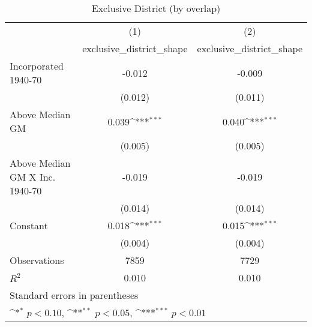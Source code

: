\begin{table}[htbp]\centering
\def\sym#1{\ifmmode^{#1}\else\(^{#1}\)\fi}
\caption{Exclusive District (by overlap)}
\begin{tabular}{l*{2}{c}}
\hline\hline
                    &\multicolumn{1}{c}{(1)}&\multicolumn{1}{c}{(2)}\\
                    &\multicolumn{1}{c}{exclusive\_district\_shape}&\multicolumn{1}{c}{exclusive\_district\_shape}\\
\hline
Incorporated 1940-70&      -0.012         &      -0.009         \\
                    &     (0.012)         &     (0.011)         \\
[1em]
Above Median GM     &       0.039\sym{***}&       0.040\sym{***}\\
                    &     (0.005)         &     (0.005)         \\
[1em]
Above Median GM X Inc. 1940-70&      -0.019         &      -0.019         \\
                    &     (0.014)         &     (0.014)         \\
[1em]
Constant            &       0.018\sym{***}&       0.015\sym{***}\\
                    &     (0.004)         &     (0.004)         \\
\hline
Observations        &        7859         &        7729         \\
\(R^{2}\)           &       0.010         &       0.010         \\
\hline\hline
\multicolumn{3}{l}{\footnotesize Standard errors in parentheses}\\
\multicolumn{3}{l}{\footnotesize \sym{*} \(p<0.10\), \sym{**} \(p<0.05\), \sym{***} \(p<0.01\)}\\
\end{tabular}
\end{table}
